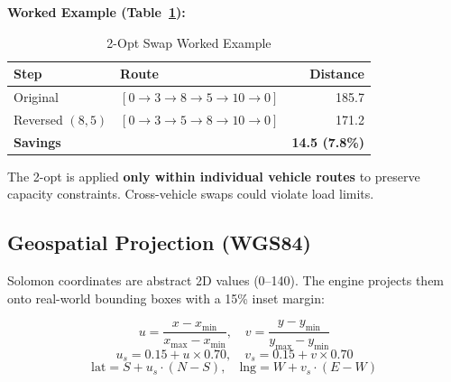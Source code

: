\documentclass[10pt,conference]{IEEEtran}
\begin{document}
\textbf{Worked Example (Table~\ref{tab:2opt_example}):}

\begin{table}[h]
\caption{2-Opt Swap Worked Example}
\label{tab:2opt_example}
\begin{center}
\begin{tabular}{|l|l|r|}
\hline
\textbf{Step} & \textbf{Route} & \textbf{Distance} \\
\hline
Original & $[0 \rightarrow 3 \rightarrow 8 \rightarrow 5 \rightarrow 10 \rightarrow 0]$ & 185.7 \\
Reversed $(8,5)$ & $[0 \rightarrow 3 \rightarrow 5 \rightarrow 8 \rightarrow 10 \rightarrow 0]$ & 171.2 \\
\hline
\textbf{Savings} & & \textbf{14.5 (7.8\%)} \\
\hline
\end{tabular}
\end{center}
\end{table}

The 2-opt is applied \textbf{only within individual vehicle routes} to preserve capacity constraints. Cross-vehicle swaps could violate load limits.

\subsection{Geospatial Projection (WGS84)}
Solomon coordinates are abstract 2D values (0--140). The engine projects them onto real-world bounding boxes with a 15\% inset margin:

\begin{equation}
    u = \frac{x - x_{\min}}{x_{\max} - x_{\min}}, \quad v = \frac{y - y_{\min}}{y_{\max} - y_{\min}}
\end{equation}
\begin{equation}
    u_s = 0.15 + u \times 0.70, \quad v_s = 0.15 + v \times 0.70
\end{equation}
\begin{equation}
    \text{lat} = S + u_s \cdot (N - S), \quad \text{lng} = W + v_s \cdot (E - W)
\end{equation}
\end{document}
